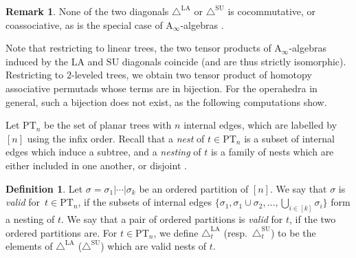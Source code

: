 \documentclass{amsart}
\newcommand{\darkblue}{\color{darkblue}} %
\theoremstyle{definition}
\newtheorem{definition}[theorem]{Definition}
\newtheorem{remark}[theorem]{Remark}
\newcommand{\PT}{\mathrm{PT}} %
\newcommand{\resp}{resp.~} %
\newcommand{\defn}[1]{\textsl{\darkblue #1}} %
\newcommand{\SU}{\mathrm{SU}}
\newcommand{\LA}{\mathrm{LA}}
\newcommand{\SUD}{\triangle^{\mathrm{SU}}}
\newcommand{\LAD}{\triangle^{\mathrm{LA}}}
\newcommand{\Ainf}{\ensuremath{\mathrm{A}_\infty}}
\begin{document}
\begin{remark}
None of the two diagonals $\LAD$ or $\SUD$ is cocommutative, or coassociative, as is the special case of $\Ainf$-algebras \cite[Thm. 13]{MarklShnider}. 
\end{remark}

Note that restricting to linear trees, the two tensor products of $\Ainf$-algebras induced by the $\LA$ and $\SU$ diagonals coincide (and are thus strictly isomorphic).
Restricting to $2$-leveled trees, we obtain two tensor product of homotopy associative permutads whose terms are in bijection.
For the operahedra in general, such a bijection does not exist, as the following computations show. 

Let $\PT_n$ be the set of planar trees with $n$ internal edges, which are labelled by $[n]$ using the infix order.
Recall that a \defn{nest} of $t \in \PT_n$ is a subset of internal edges which induce a subtree, and a \defn{nesting} of $t$ is a family of nests which are either included in one another, or disjoint \cite[Def.~2.1 \& 2.22]{LaplanteAnfossi}.

\begin{definition}
\label{def:valid}
Let $\sigma=\sigma_1| \cdots |\sigma_k$ be an ordered partition of $[n]$. 
We say that $\sigma$ is \defn{valid} for~$t \in \PT_n$, if the subsets of internal edges $\{\sigma_1, \sigma_1 \cup \sigma_2,\dots,\bigcup_{i \in [k]} \sigma_i\}$ form a nesting of $t$.
We say that a pair of ordered partitions is \defn{valid} for $t$, if the two ordered partitions are.
For $t \in \PT_n$, we define $\LAD_t$ (\resp $\SUD_t$) to be the elements of $\LAD$ ($\SUD$) which are valid nests of $t$.
\end{definition}
\end{document}
